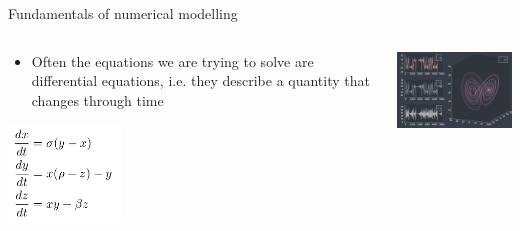 \begin{frame}{\insertsectionnumber{ |} Fundamentals of numerical modelling}


\begin{columns}

\column[c]{4.5cm}

\begin{beamerboxesrounded}[lower=gray,shadow=true]{
\begin{itemize}
\item Often the equations we are trying to solve are differential equations, i.e. they describe a quantity that changes through time
\end{itemize}
\centering\includegraphics[width=3cm]{images/lorenz_eqs.png}\\
}
\end{beamerboxesrounded}

\column[c]{6.5cm}
\includegraphics[width=6.5cm]{images/lorenz.png}
\end{columns}
\vspace*{0.5cm} \\

\end{frame}





